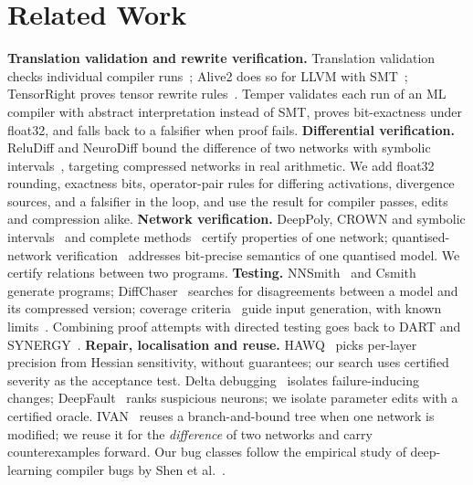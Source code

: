 \documentclass[conference]{IEEEtran}
\begin{document}
\section{Related Work}
\textbf{Translation validation and rewrite verification.} Translation validation checks individual compiler runs~\cite{pnueli,necula}; Alive2 does so for LLVM with SMT~\cite{alive2}; TensorRight proves tensor rewrite rules~\cite{tensorright}. Temper validates each run of an ML compiler with abstract interpretation instead of SMT, proves bit-exactness under float32, and falls back to a falsifier when proof fails.
\textbf{Differential verification.} ReluDiff and NeuroDiff bound the difference of two networks with symbolic intervals~\cite{reludiff,neurodiff}, targeting compressed networks in real arithmetic. We add float32 rounding, exactness bits, operator-pair rules for differing activations, divergence sources, and a falsifier in the loop, and use the result for compiler passes, edits and compression alike.
\textbf{Network verification.} DeepPoly, CROWN and symbolic intervals~\cite{deeppoly,crown,reluval} and complete methods~\cite{reluplex} certify properties of one network; quantised-network verification~\cite{qnnverify} addresses bit-precise semantics of one quantised model. We certify relations between two programs.
\textbf{Testing.} NNSmith~\cite{nnsmith} and Csmith~\cite{csmith} generate programs; DiffChaser~\cite{diffchaser} searches for disagreements between a model and its compressed version; coverage criteria~\cite{deepxplore,deepgauge} guide input generation, with known limits~\cite{harel}. Combining proof attempts with directed testing goes back to DART and SYNERGY~\cite{gopinath,synergy}.
\textbf{Repair, localisation and reuse.} HAWQ~\cite{hawq} picks per-layer precision from Hessian sensitivity, without guarantees; our search uses certified severity as the acceptance test. Delta debugging~\cite{ddmin} isolates failure-inducing changes; DeepFault~\cite{deepfault} ranks suspicious neurons; we isolate parameter edits with a certified oracle. IVAN~\cite{ivan} reuses a branch-and-bound tree when one network is modified; we reuse it for the \emph{difference} of two networks and carry counterexamples forward. Our bug classes follow the empirical study of deep-learning compiler bugs by Shen et al.~\cite{dlcbugs}.
\end{document}
